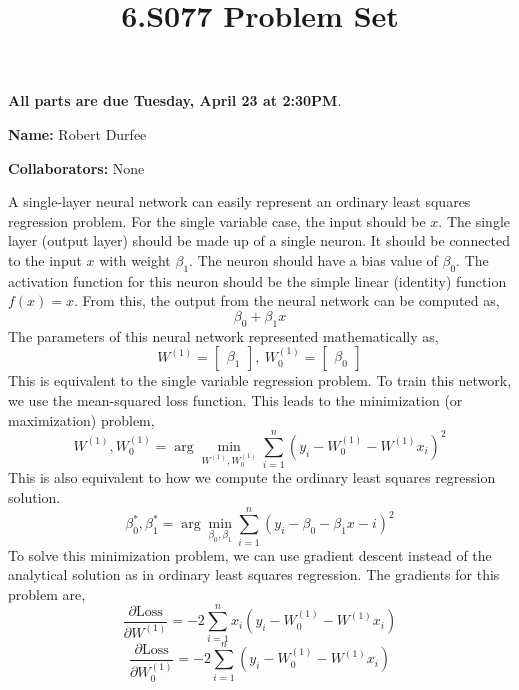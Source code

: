 \documentclass[12pt,twoside]{article}
\title{6.S077 Problem Set \theproblemsetnum}
\newcommand{\theproblemsetnum}{7}
\newcommand{\releasedate}{Tuesday, April 9}
\newcommand{\partaduedate}{Tuesday, April 23}
\begin{document}
\handout{Problem Set \theproblemsetnum}{\releasedate}
\textbf{All parts are due {\bf \partaduedate} at {\bf 2:30PM}}.

\setlength{\parindent}{0pt}
\medskip\hrulefill\medskip

{\bf Name:} Robert Durfee

\medskip

{\bf Collaborators:} None

\medskip\hrulefill

\begin{problems}

\problem  %

A single-layer neural network can easily represent an ordinary least squares
regression problem. For the single variable case, the input should be $x$.
The single layer (output layer) should be made up of a single neuron. It
should be connected to the input $x$ with weight $\beta_1$. The neuron should
have a bias value of $\beta_0$. The activation function for this neuron
should be the simple linear (identity) function $f(x) = x$. From this, the
output from the neural network can be computed as,
$$ \beta_0 + \beta_1 x $$
The parameters of this neural network represented mathematically as,
$$ W^{(1)} = \begin{bmatrix}
    \beta_1
\end{bmatrix},\ W_0^{(1)} = \begin{bmatrix}
    \beta_0
\end{bmatrix} $$
This is equivalent to the single variable regression problem. To train this
network, we use the mean-squared loss function. This leads to the
minimization (or maximization) problem,
$$ W^{(1)}, W_0^{(1)} = \arg\min_{W^{(1)}, W_0^{(1)}} \sum_{i = 1}^n (y_i -
W_0^{(1)} - W^{(1)} x_i)^2 $$
This is also equivalent to how we compute the ordinary least squares
regression solution. 
$$ \beta_0^*, \beta_1^* = \arg\min_{\beta_0, \beta_1} \sum_{i = 1}^n (y_i -
\beta_0 - \beta_1 x-i)^2 $$
To solve this minimization problem, we can use gradient descent instead of
the analytical solution as in ordinary least squares regression. The
gradients for this problem are,
$$ \frac{\partial \mathrm{Loss}}{\partial W^{(1)}} = -2 \sum_{i = 1}^n x_i
(y_i - W_0^{(1)} - W^{(1)} x_i) $$
$$ \frac{\partial \mathrm{Loss}}{\partial W_0^{(1)}} = -2 \sum_{i = 1}^n (y_i
- W_0^{(1)} - W^{(1)} x_i) $$

\newpage

\problem  %

\begin{problemparts}


\end{problemparts}
\end{problems}
\end{document}
